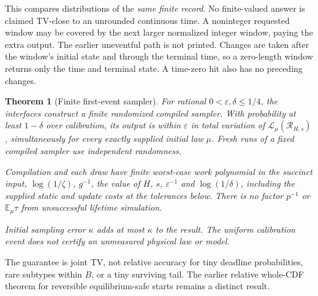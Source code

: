 \documentclass[10pt,a4paper]{article}
\newtheorem{theorem}{Theorem}
\newcommand{\E}{\mathbb E}
\newcommand{\Law}{\mathcal L}
\newcommand{\eps}{\varepsilon}
\begin{document}
This compares distributions of the \emph{same finite record}. No finite-valued answer is claimed TV-close to an unrounded continuous time. A noninteger requested window may be covered by the next larger normalized integer window, paying the extra output. The earlier uneventful path is not printed.
Changes are taken after the window's initial state and through the terminal time, so a zero-length window returns only the time and terminal state. A time-zero hit also has no preceding changes.

\begin{theorem}[Finite first-event sampler]\label{thm:main}
For rational $0<\eps,\delta\le1/4$, the interfaces construct a finite randomized compiled sampler. With probability at least $1-\delta$ over calibration, its output is within $\eps$ in total variation of $\Law_\mu(\mathcal R_{H,s})$, simultaneously for every exactly supplied initial law $\mu$. Fresh runs of a fixed compiled sampler use independent randomness.

Compilation and each draw have finite worst-case work polynomial in the succinct input, $\log(1/\zeta)$, $g^{-1}$, the \emph{value} of $H$, $s$, $\eps^{-1}$ and $\log(1/\delta)$, including the supplied static and update costs at the tolerances below. There is no factor $p^{-1}$ or $\E_\mu\tau$ from unsuccessful lifetime simulation.

Initial sampling error $\kappa$ adds at most $\kappa$ to the result. The uniform calibration event does not certify an unmeasured physical law or model.
\end{theorem}

The guarantee is joint TV, not relative accuracy for tiny deadline probabilities, rare subtypes within $B$, or a tiny surviving tail. The earlier relative whole-CDF theorem for reversible equilibrium-safe starts remains a distinct result.
\end{document}
